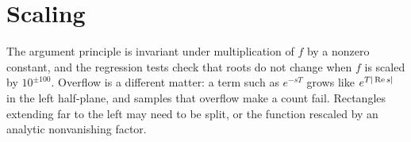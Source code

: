 \section{Scaling}

The argument principle is invariant under multiplication of $f$ by a
nonzero constant, and the regression tests check that roots do not change
when $f$ is scaled by $10^{\pm100}$. Overflow is a different matter: a
term such as $e^{-sT}$ grows like $e^{T|\operatorname{Re} s|}$ in the left half-plane,
and samples that overflow make a count fail. Rectangles extending far to
the left may need to be split, or the function rescaled by an analytic
nonvanishing factor.
